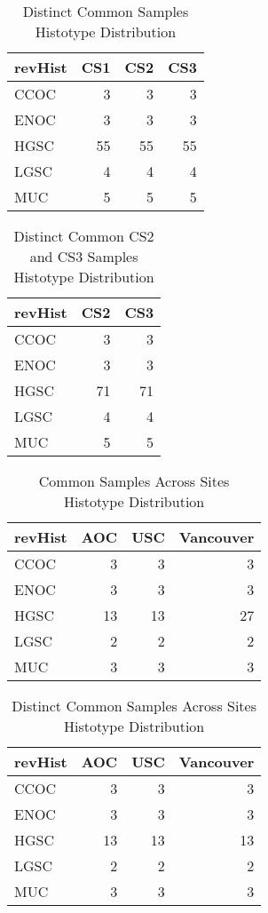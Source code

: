 \documentclass[
]{report}
\begin{document}
\begin{table}

\caption{\label{tab:common-dist-distinct}Distinct Common Samples Histotype Distribution}
\centering
\begin{tabular}[t]{l|r|r|r}
\hline
revHist & CS1 & CS2 & CS3\\
\hline
CCOC & 3 & 3 & 3\\
\hline
ENOC & 3 & 3 & 3\\
\hline
HGSC & 55 & 55 & 55\\
\hline
LGSC & 4 & 4 & 4\\
\hline
MUC & 5 & 5 & 5\\
\hline
\end{tabular}
\end{table}

\begin{table}

\caption{\label{tab:common-cs2-cs3-dist-distinct}Distinct Common CS2 and CS3 Samples Histotype Distribution}
\centering
\begin{tabular}[t]{l|r|r}
\hline
revHist & CS2 & CS3\\
\hline
CCOC & 3 & 3\\
\hline
ENOC & 3 & 3\\
\hline
HGSC & 71 & 71\\
\hline
LGSC & 4 & 4\\
\hline
MUC & 5 & 5\\
\hline
\end{tabular}
\end{table}

\begin{table}

\caption{\label{tab:common-dist-sites}Common Samples Across Sites Histotype Distribution}
\centering
\begin{tabular}[t]{l|r|r|r}
\hline
revHist & AOC & USC & Vancouver\\
\hline
CCOC & 3 & 3 & 3\\
\hline
ENOC & 3 & 3 & 3\\
\hline
HGSC & 13 & 13 & 27\\
\hline
LGSC & 2 & 2 & 2\\
\hline
MUC & 3 & 3 & 3\\
\hline
\end{tabular}
\end{table}

\begin{table}

\caption{\label{tab:common-dist-sites-distinct}Distinct Common Samples Across Sites Histotype Distribution}
\centering
\begin{tabular}[t]{l|r|r|r}
\hline
revHist & AOC & USC & Vancouver\\
\hline
CCOC & 3 & 3 & 3\\
\hline
ENOC & 3 & 3 & 3\\
\hline
HGSC & 13 & 13 & 13\\
\hline
LGSC & 2 & 2 & 2\\
\hline
MUC & 3 & 3 & 3\\
\hline
\end{tabular}
\end{table}
\end{document}
